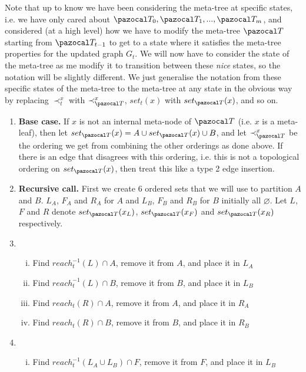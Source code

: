 \documentclass{report}
\begin{document}
Note that up to know we have been considering the meta-tree at specific states, i.e. we have only cared about $\pazocal T_0, \pazocal T_1,..., \pazocal T_m$, and considered (at a high level) how we have to modify the meta-tree $\pazocal T$ starting from $\pazocal T_{t-1}$ to get to a state where it satisfies the meta-tree properties for the updated graph $G_t$. We will now have to consider the state of the meta-tree as me modify it to transition between these \textit{nice} states, so the notation will be slightly different. We just generalise the notation from these specific states of the meta-tree to the meta-tree at any state in the obvious way by replacing $\prec_t^x$ with $\prec_{\pazocal T}^x$, $set_t(x)$ with $set_{\pazocal T}(x)$, and so on.


\begin{enumerate}
    \item \textbf{Base case.} If $x$ is not an internal meta-node of $\pazocal T$ (i.e. $x$ is a meta-leaf), then let $set_{\pazocal T}(x)=A\cup set_{\pazocal T}(x)\cup B$, and let $\prec_{\pazocal T}^{x}$ be the ordering we get from combining the other orderings as done above. If there is an edge that disagrees with this ordering, i.e. this is not a topological ordering on $set_{\pazocal T}(x)$, then treat this like a type 2 edge insertion. 
    \item \textbf{Recursive call.} First we create 6 ordered sets that we will use to partition $A$ and $B$. $L_{A}$, $F_{A}$ and $R_{A}$ for $A$ and $L_{B}$, $F_{B}$ and $R_{B}$ for $B$ initially all $\varnothing$. Let $L$, $F$ and $R$ denote $set_{\pazocal T}(x_{L})$, $set_{\pazocal T}(x_{F})$ and $set_{\pazocal T}(x_{R})$ respectively.
    \item \begin{enumerate}[i.] 
        \item Find $reach_{t}^{-1}(L) \cap A$, remove it from $A$, and place it in $L_{A}$
        \item Find $reach_{t}^{-1}(L) \cap B$, remove it from $B$, and place it in $L_{B}$
        \item Find $reach_{t}(R) \cap A$, remove it from $A$, and place it in $R_{A}$
        \item Find $reach_{t}(R) \cap B$, remove it from $B$, and place it in $R_{B}$
        \end{enumerate}
    \item \begin{enumerate}[i.] 
        \item Find $reach_{t}^{-1}(L_{A} \cup L_{B}) \cap F$, remove it from $F$, and place it in $L_{B}$

\end{enumerate}
\end{enumerate}
\end{document}
